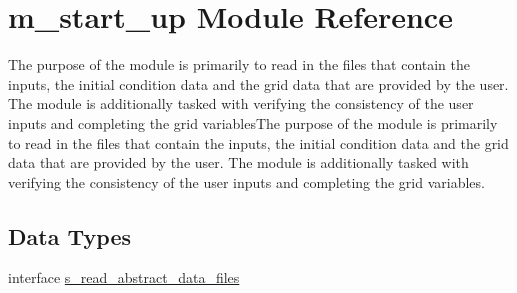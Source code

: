 \hypertarget{namespacem__start__up}{}\section{m\+\_\+start\+\_\+up Module Reference}
\label{namespacem__start__up}


The purpose of the module is primarily to read in the files that contain the inputs, the initial condition data and the grid data that are provided by the user. The module is additionally tasked with verifying the consistency of the user inputs and completing the grid variables\+The purpose of the module is primarily to read in the files that contain the inputs, the initial condition data and the grid data that are provided by the user. The module is additionally tasked with verifying the consistency of the user inputs and completing the grid variables.  


\subsection*{Data Types}
\begin{DoxyCompactItemize}
\item 
interface \hyperlink{interfacem__start__up_1_1s__read__abstract__data__files}{s\+\_\+read\+\_\+abstract\+\_\+data\+\_\+files}
\end{DoxyCompactItemize}
